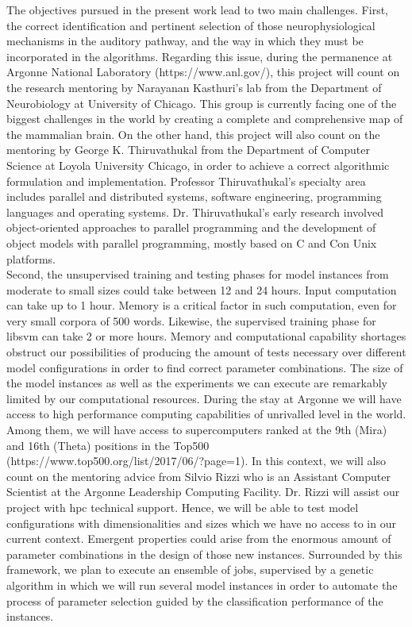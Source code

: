 \documentclass[11pt,a4paper]{article}
\newcommand{\CC}{C\nolinebreak\hspace{-.05em}\raisebox{.4ex}{\tiny\bf +}\nolinebreak\hspace{-.10em}\raisebox{.4ex}{\tiny\bf +}}
\begin{document}
The objectives pursued in the present work lead to two main challenges.
First, the correct identification and pertinent selection of those neurophysiological
mechanisms in the auditory pathway, and the way in which they must be incorporated
in the algorithms.
Regarding this issue, during the permanence at Argonne National Laboratory (https://www.anl.gov/),
this project will count on the
research mentoring by Narayanan Kasthuri's lab
from the Department of Neurobiology at University of Chicago.
This group is currently facing one of the biggest challenges in the world by 
creating a complete and comprehensive map of the mammalian brain.
On the other hand, this project will also count on the mentoring by
George K. Thiruvathukal from the Department of Computer Science at
Loyola University Chicago,
in order to achieve a correct algorithmic formulation and implementation.
Professor Thiruvathukal's specialty area includes
parallel and distributed systems, software engineering, programming languages and operating systems.
Dr. Thiruvathukal's early research involved object-oriented approaches to parallel programming
and the development of object models with parallel programming, mostly based on C and \CC  on Unix platforms. \\

Second, the
unsupervised training and testing phases for model instances from moderate to small sizes
could take between 12 and 24 hours.
Input computation can take up to 1 hour.
Memory is a critical factor in such computation,
even for very small corpora of 500 words.
Likewise, the supervised training phase for \gls{libsvm} can take 2 or more hours.
Memory and computational capability shortages obstruct our possibilities of producing
the amount of tests necessary over different model configurations in order to find correct
parameter combinations.
The size of the model instances as well as the experiments we can execute
are remarkably limited by our computational resources.
During the stay at Argonne we will have access
to high performance computing capabilities of unrivalled level in the world.
Among them, we will have access to supercomputers
ranked at the 9th (Mira) and 16th (Theta) positions in the Top500
(https://www.top500.org/list/2017/06/?page=1).
In this context, we will also count on the mentoring advice from Silvio Rizzi
who is an Assistant Computer Scientist at the Argonne Leadership Computing Facility.
Dr. Rizzi will assist our project with \gls{hpc} technical support.
Hence, we will be able to test model configurations
with dimensionalities and sizes which we have no access to in our current context.
Emergent properties could arise from the enormous amount of parameter combinations in the design
of those new instances.
Surrounded by this framework, we plan to execute an ensemble of jobs,
supervised by a genetic algorithm in which we will run several model instances
in order to automate the process of parameter selection guided by the
classification performance of the instances. \\
\end{document}
